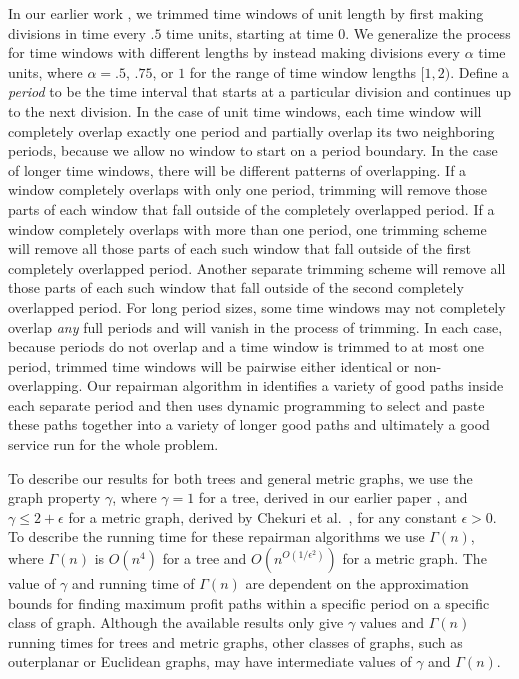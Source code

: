 \documentclass[11pt]{article}
\begin{document}
In our earlier work \cite{Frederickson6, Frederickson5}, we trimmed time windows of unit length by first making divisions in time every $.5$ time units, starting at time 0.  We generalize the process for time windows with different lengths by instead making divisions every $\alpha$ time units, where $\alpha = .5$, $.75$, or $1$ for the range of time window lengths $[1,2)$.
Define a {\em period} to be the time interval that starts at a particular division and continues up to the next division.  In the case of unit time windows, each time window will completely overlap exactly one period and partially overlap its two neighboring periods, because we allow no window to start on a period boundary.  In the case of longer time windows, there will be different patterns of overlapping.  If a window completely overlaps with only one period, trimming will remove those parts of each window that fall outside of the completely overlapped period.  If a window completely overlaps with more than one period, one trimming scheme will remove all those parts of each such window that fall outside of the first completely overlapped period.  Another separate trimming scheme will remove all those parts of each such window that fall outside of the second completely overlapped period.  For long period sizes, some time windows may not completely overlap {\em any} full periods and will vanish in the process of trimming.  In each case, because periods do not overlap and a time window is trimmed to at most one period, trimmed time windows will be pairwise either identical or non-overlapping.  Our repairman algorithm in \cite{Frederickson6} identifies a variety of good paths inside each separate period and then uses dynamic programming to select and paste these paths together into a variety of longer good paths and ultimately a good service run for the whole problem.

To describe our results for both trees and general metric graphs, we use the graph property $\gamma$, where $\gamma = 1$ for a tree, derived in our earlier paper \cite{Frederickson6}, and $\gamma \leq 2 + \epsilon$ for a metric graph, derived by Chekuri et al.~\cite{Chekuri2}, for any constant $\epsilon > 0$.  To describe the running time for these repairman algorithms we use $\Gamma(n)$, where $\Gamma(n)$ is $O(n^4)$ for a tree and $O(n^{O(1/\epsilon^2)})$ for a metric graph.  The value of $\gamma$ and running time of $\Gamma(n)$ are dependent on the approximation bounds for finding maximum profit paths within a specific period on a specific class of graph.  Although the available results only give $\gamma$ values and $\Gamma(n)$ running times for trees and metric graphs, other classes of graphs, such as outerplanar or Euclidean graphs, may have intermediate values of $\gamma$ and $\Gamma(n)$.  
\end{document}
